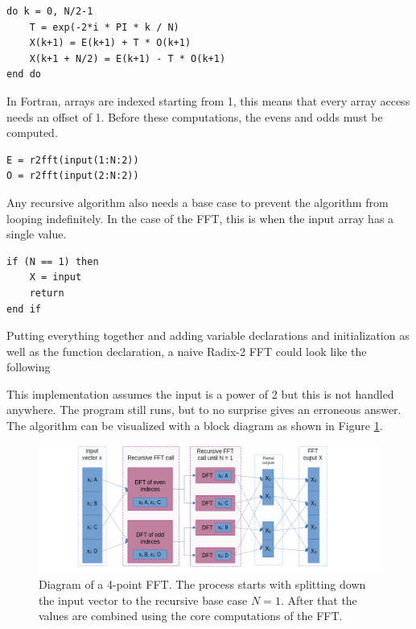 \begin{lstlisting}
do k = 0, N/2-1
    T = exp(-2*i * PI * k / N) 
    X(k+1) = E(k+1) + T * O(k+1)
    X(k+1 + N/2) = E(k+1) - T * O(k+1)
end do
\end{lstlisting}

In Fortran, arrays are indexed starting from 1, this means that every array access needs an offset of 1. Before these computations, the evens and odds must be computed.

\begin{lstlisting}
E = r2fft(input(1:N:2))
O = r2fft(input(2:N:2))
\end{lstlisting}

Any recursive algorithm also needs a base case to prevent the algorithm from looping indefinitely. In the case of the FFT, this is when the input array has a single value.

\begin{lstlisting}    
if (N == 1) then
    X = input
    return
end if
\end{lstlisting}

Putting everything together and adding variable declarations and initialization as well as the function declaration, a naive Radix-2 FFT could look like the following



This implementation assumes the input is a power of 2 but this is not handled anywhere. The program still runs, but to no surprise gives an erroneous answer. The algorithm can be visualized with a block diagram as shown in Figure \ref{fig:FFT-Alg}.

\begin{figure}[ht]
    \centering
    \includegraphics[width=\textwidth]{./images/fft.png}
    \caption{Diagram of a 4-point FFT. The process starts with splitting down the input vector to the recursive base case $N=1$. After that the values are combined using the core computations of the FFT.\label{fig:FFT-Alg}}
\end{figure}


